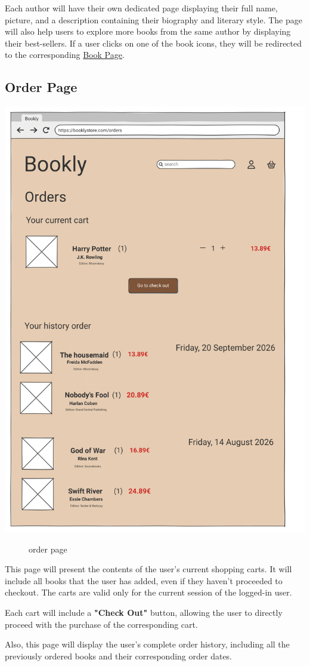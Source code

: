 Each author will have their own dedicated page displaying their full name, picture, and a description containing their biography and literary style. The page will also help users to explore more books from the same author by displaying their best-sellers. If a user clicks on one of the book icons, they will be redirected to the corresponding \hyperref[sec:book]{Book Page}.

\subsection{Order Page} \label{sec:cart}
\includegraphics[width=0.6\linewidth]{HW1Report/photos/cartPage.png}

\begin{figure}[h!]
    \centering
    \caption{order page}
    \label{fig:enter-label}
\end{figure}

This page will present the contents of the user's current shopping carts. It will include all books that the user has added, even if they haven't proceeded to checkout. The carts are valid only for the current session of the logged-in user.

Each cart will include a \textbf{"Check Out"} button, allowing the user to directly proceed with the purchase of the corresponding cart.

Also, this page will display the user's complete order history, including all the previously ordered books and their corresponding order dates.

